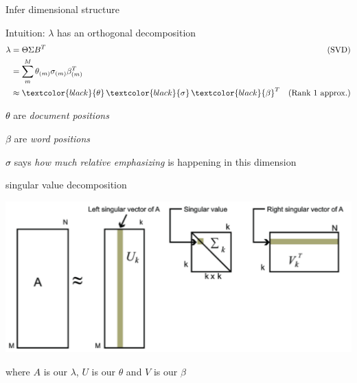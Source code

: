 \documentclass{hertieteaching}
\begin{document}

\begin{frame}{Infer dimensional structure}

Intuition: $\lambda$ has an orthogonal decomposition
\begin{align*}
\lambda & = \Theta\Sigma B^T & \text{{\normalsize (SVD)}}\\
                  &= \sum^{M}_{m} \theta_{(m)} \sigma_{(m)} \beta_{(m)}^T\\
                  &\approx \textcolor{black}{\theta}\,\textcolor{black}{\sigma}\,\textcolor{black}{\beta}^T & \text{{\normalsize (Rank 1 approx.)}}
\end{align*}

\textcolor{black}{$\theta$} are \textit{document positions}

\textcolor{black}{$\beta$} are \textit{word positions}

\textcolor{black}{$\sigma$} says \textit{how much relative emphasizing} is happening in this dimension

\end{frame}

\begin{frame}{singular value decomposition}

\bigskip
\centerline{\includegraphics[scale=0.6]{pictures/svd}}

\medskip
where $A$ is our $\lambda$, $U$ is our $\theta$ and $V$ is our $\beta$
\end{frame}
\end{document}
